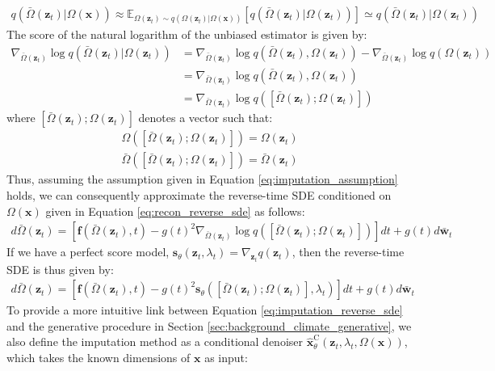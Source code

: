 \documentclass[ oneside,%
                    author={George Herbert},
                    degree={MSci},
                     title={Diffusion Models for Time-Evolving Precipitation Fields},
                  subtitle={}]{dissertation}
\begin{document}
\begin{align}
      q(\bar\Omega(\mathbf{z}_t)|\Omega(\mathbf{x})) \approx \mathbb{E}_{\Omega(\mathbf{z}_t)\sim q(\Omega(\mathbf{z}_t)|\Omega(\mathbf{x}))}\left[q(\bar\Omega(\mathbf{z}_t)| \Omega(\mathbf{z}_t))\right] \simeq q(\bar\Omega(\mathbf{z}_t)| \Omega(\mathbf{z}_t))
\end{align}
The score of the natural logarithm of the unbiased estimator is given by:
\begin{align}
      \nabla_{\bar\Omega(\mathbf{z}_t)} \log q(\bar\Omega(\mathbf{z}_t)| \Omega(\mathbf{z}_t))&=\nabla_{\bar\Omega(\mathbf{z}_t)} \log q(\bar\Omega(\mathbf{z}_t), \Omega(\mathbf{z}_t)) - \nabla_{\bar\Omega(\mathbf{z}_t)} \log q(\Omega(\mathbf{z}_t))\\
      &=\nabla_{\bar\Omega(\mathbf{z}_t)} \log q(\bar\Omega(\mathbf{z}_t), \Omega(\mathbf{z}_t))\\
      &=\nabla_{\bar\Omega(\mathbf{z}_t)} \log q([\bar\Omega(\mathbf{z}_t); \Omega(\mathbf{z}_t)])
\end{align}
where $[\bar\Omega(\mathbf{z}_t); \Omega(\mathbf{z}_t)]$ denotes a vector such that:
\begin{align}
      \Omega([\bar\Omega(\mathbf{z}_t); \Omega(\mathbf{z}_t)]) = \Omega(\mathbf{z}_t)\\
      \bar\Omega([\bar\Omega(\mathbf{z}_t); \Omega(\mathbf{z}_t)]) = \bar\Omega(\mathbf{z}_t)
\end{align}
Thus, assuming the assumption given in Equation \ref{eq:imputation_assumption} holds, we can consequently approximate the reverse-time SDE conditioned on $\Omega(\mathbf{x})$ given in Equation \ref{eq:recon_reverse_sde} as follows:
\begin{align}
      d\bar\Omega(\mathbf{z}_t)=\left[\mathbf{f}(\bar\Omega(\mathbf{z}_t), t) - g(t)^2\nabla_{\bar\Omega(\mathbf{z}_t)}\log q([\bar\Omega(\mathbf{z}_t); \Omega(\mathbf{z}_t)])\right]dt + g(t)d \bar{\mathbf{w}}_t
\end{align}
If we have a perfect score model, $\mathbf{s}_\theta(\mathbf{z}_t, \lambda_t)=\nabla_{\mathbf{z}_t} q(\mathbf{z}_t)$, then the reverse-time SDE is thus given by:
\begin{align}
      d\bar\Omega(\mathbf{z}_t)=\left[\mathbf{f}(\bar\Omega(\mathbf{z}_t), t) - g(t)^2 \mathbf{s}_\theta([\bar\Omega(\mathbf{z}_t); \Omega(\mathbf{z}_t)], \lambda_t)\right]dt + g(t)d \bar{\mathbf{w}}_t\label{eq:imputation_reverse_sde}
\end{align}
To provide a more intuitive link between Equation \ref{eq:imputation_reverse_sde} and the generative procedure in Section \ref{sec:background_climate_generative}, we also define the imputation method as a conditional denoiser $\hat{\mathbf{x}}^{\mathrm{C}}_\theta(\mathbf{z}_t, \lambda_t, \Omega(\mathbf{x}))$, which takes the known dimensions of $\mathbf{x}$ as input:
\end{document}
